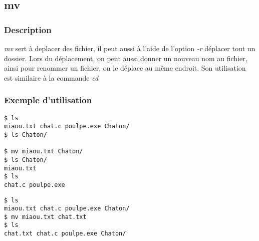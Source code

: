 \subsection{mv}
\subsubsection{Description}
\emph{mv} sert à deplacer des fichier, il peut aussi à l'aide de l'option \emph{-r} déplacer tout un dossier.
Lors du déplacement, on peut aussi donner un nouveau nom au fichier, ainsi pour renommer un fichier, on le déplace au même endroit.
Son utilisation est similaire à la commande \emph{cd}

\subsubsection{Exemple d'utilisation}

\begin{lstlisting}[caption=déplacement d'un fichier]
$ ls
miaou.txt chat.c poulpe.exe Chaton/
$ ls Chaton/

$ mv miaou.txt Chaton/
$ ls Chaton/
miaou.txt
$ ls
chat.c poulpe.exe
\end{lstlisting}

\begin{lstlisting}[caption=renommer un fichier]
$ ls
miaou.txt chat.c poulpe.exe Chaton/
$ mv miaou.txt chat.txt
$ ls
chat.txt chat.c poulpe.exe Chaton/
\end{lstlisting}
